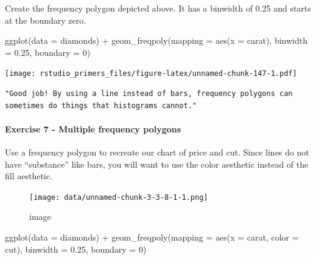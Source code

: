 \documentclass[
]{article}
\newenvironment{Shaded}{\begin{snugshade}}{\end{snugshade}}
\newcommand{\AttributeTok}[1]{\textcolor[rgb]{0.77,0.63,0.00}{#1}}
\newcommand{\DecValTok}[1]{\textcolor[rgb]{0.00,0.00,0.81}{#1}}
\newcommand{\FloatTok}[1]{\textcolor[rgb]{0.00,0.00,0.81}{#1}}
\newcommand{\FunctionTok}[1]{\textcolor[rgb]{0.00,0.00,0.00}{#1}}
\newcommand{\NormalTok}[1]{#1}
\newcommand{\SpecialCharTok}[1]{\textcolor[rgb]{0.00,0.00,0.00}{#1}}
\begin{document}
Create the frequency polygon depicted above. It has a binwidth of 0.25
and starts at the boundary zero.

\begin{Shaded}
\begin{Highlighting}[]
\FunctionTok{ggplot}\NormalTok{(}\AttributeTok{data =}\NormalTok{ diamonds) }\SpecialCharTok{+}
  \FunctionTok{geom\_freqpoly}\NormalTok{(}\AttributeTok{mapping =} \FunctionTok{aes}\NormalTok{(}\AttributeTok{x =}\NormalTok{ carat), }\AttributeTok{binwidth =} \FloatTok{0.25}\NormalTok{, }\AttributeTok{boundary =} \DecValTok{0}\NormalTok{)}
\end{Highlighting}
\end{Shaded}

\texttt{[image: rstudio\_primers\_files/figure-latex/unnamed-chunk-147-1.pdf]}

\begin{verbatim}
"Good job! By using a line instead of bars, frequency polygons can sometimes do things that histograms cannot."
\end{verbatim}

\hypertarget{exercise-7---multiple-frequency-polygons}{%
\paragraph{Exercise 7 - Multiple frequency
polygons}\label{exercise-7---multiple-frequency-polygons}}

Use a frequency polygon to recreate our chart of price and cut. Since
lines do not have ``substance'' like bars, you will want to use the
color aesthetic instead of the fill aesthetic.

\begin{figure}
\centering
\texttt{[image: data/unnamed-chunk-3-3-8-1-1.png]}
\caption{image}
\end{figure}

\begin{Shaded}
\begin{Highlighting}[]
\FunctionTok{ggplot}\NormalTok{(}\AttributeTok{data =}\NormalTok{ diamonds) }\SpecialCharTok{+}
  \FunctionTok{geom\_freqpoly}\NormalTok{(}\AttributeTok{mapping =} \FunctionTok{aes}\NormalTok{(}\AttributeTok{x =}\NormalTok{ carat, }\AttributeTok{color =}\NormalTok{ cut), }\AttributeTok{binwidth =} \FloatTok{0.25}\NormalTok{, }\AttributeTok{boundary =} \DecValTok{0}\NormalTok{)}
\end{Highlighting}
\end{Shaded}
\end{document}
